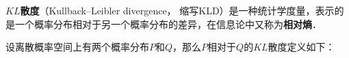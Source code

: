 

\textbf{$KL$散度}（Kullback–Leibler divergence， 缩写KLD）是一种统计学度量，表示的是一个概率分布相对于另一个概率分布的差异，在信息论中又称为\textbf{相对熵}．

设离散概率空间上有两个概率分布$P$和$Q$，那么$P$相对于$Q$的$KL$散度定义如下：
\begin{equation}

\end{equation}